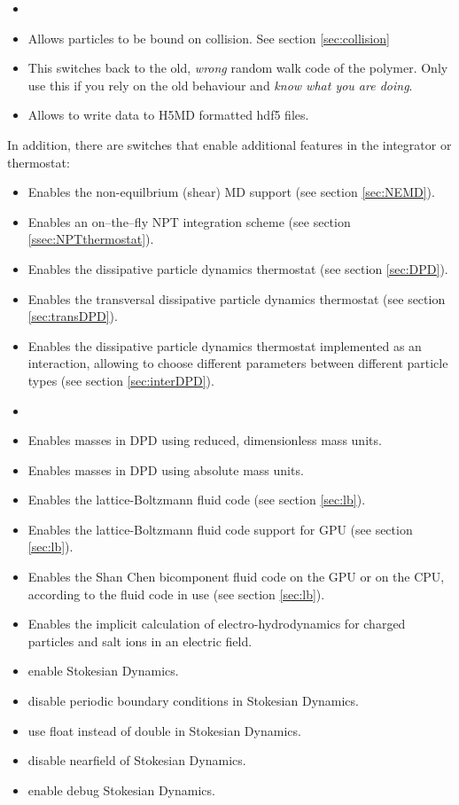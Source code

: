\begin{itemize}
\item {}
\item {} Allows particles to be bound on collision. See section \ref{sec:collision}
\item {} This switches back to the old,
  \emph{wrong} random walk code of the polymer. Only use this if you
  rely on the old behaviour and \emph{know what you are doing}.
\item {} Allows to write data to H5MD formatted hdf5 files.
\end{itemize}

In addition, there are switches that enable additional features in the
integrator or thermostat:
\begin{itemize}
\item {} Enables the non-equilbrium (shear) MD support
  (see section \vref{sec:NEMD}).
\item {} Enables an on--the--fly NPT integration scheme
  (see section \vref{ssec:NPTthermostat}).
\item {} Enables the dissipative particle dynamics
  thermostat (see section \vref{sec:DPD}).
\item {} Enables the transversal dissipative
  particle dynamics thermostat (see section \vref{sec:transDPD}).
\item {} Enables the dissipative
  particle dynamics thermostat implemented as an interaction,
  allowing to choose different parameters between different particle
  types (see section \vref{sec:interDPD}).
\item {} 
\item {} Enables masses in DPD using reduced,
  dimensionless mass units.
\item {} Enables masses in DPD using absolute
  mass units.
\item {} Enables the lattice-Boltzmann fluid code (see
  section \vref{sec:lb}).
\item {} Enables the lattice-Boltzmann fluid code support for GPU (see
  section \vref{sec:lb}).
\item {} Enables the Shan Chen bicomponent fluid code on the GPU or on the CPU, according to the fluid code in use (see
  section \vref{sec:lb}).
\item {} Enables the implicit
  calculation of electro-hydrodynamics for charged particles and salt
  ions in an electric field.
\item {} enable Stokesian Dynamics.
\item {} disable periodic boundary conditions in
  Stokesian Dynamics.
\item {} use float instead of double in Stokesian
  Dynamics.
\item {} disable nearfield of Stokesian Dynamics.
\item {} enable debug Stokesian Dynamics.
  

\end{itemize}
